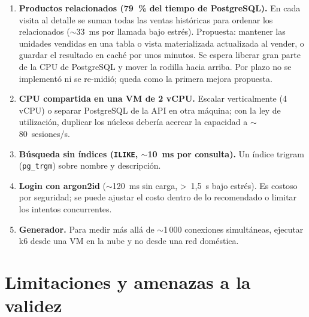 \documentclass[11pt,a4paper]{article}
\newcommand{\codigo}[1]{\texttt{#1}}
\begin{document}
\begin{enumerate}
  \item \textbf{Productos relacionados (79~\% del tiempo de PostgreSQL).} En cada
        visita al detalle se suman todas las ventas históricas para ordenar los
        relacionados ($\sim$33~ms por llamada bajo estrés). Propuesta: mantener
        las unidades vendidas en una tabla o vista materializada actualizada al
        vender, o guardar el resultado en caché por unos minutos. Se espera
        liberar gran parte de la CPU de PostgreSQL y mover la rodilla hacia
        arriba. Por plazo no se implementó ni se re-midió; queda como la
        primera mejora propuesta.
  \item \textbf{CPU compartida en una VM de 2 vCPU.} Escalar verticalmente (4
        vCPU) o separar PostgreSQL de la API en otra máquina; con la ley de
        utilización, duplicar los núcleos debería acercar la capacidad a
        $\sim$80~sesiones/s.
  \item \textbf{Búsqueda sin índices (\codigo{ILIKE}, $\sim$10~ms por consulta).}
        Un índice trigram (\codigo{pg\_trgm}) sobre nombre y descripción.
  \item \textbf{Login con argon2id} ($\sim$120~ms sin carga, >~1,5~s bajo
        estrés). Es costoso por seguridad; se puede ajustar el costo dentro de
        lo recomendado o limitar los intentos concurrentes.
  \item \textbf{Generador.} Para medir más allá de $\sim$1\,000 conexiones
        simultáneas, ejecutar k6 desde una VM en la nube y no desde una red
        doméstica.
\end{enumerate}

\section{Limitaciones y amenazas a la validez}
\label{sec:limitaciones}
\end{document}

